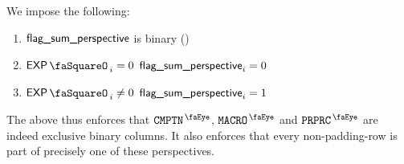 We impose the following:
\begin{enumerate}
    \item $\textsf{flag\_sum}\textsf{\_perspective}$ is binary  \quad (\trash)
    \item \If $\expStamp_{i} =    0$ \Then $\textsf{flag\_sum}\textsf{\_perspective}_{i} = 0$
    \item \If $\expStamp_{i} \neq 0$ \Then $\textsf{flag\_sum}\textsf{\_perspective}_{i} = 1$
\end{enumerate}
The above thus enforces that
$\isComputation$,
$\isMacro$ and
$\isPreprocessing$
are indeed exclusive binary columns.
It also enforces that every non-padding-row is part of precisely one of these perspectives.
